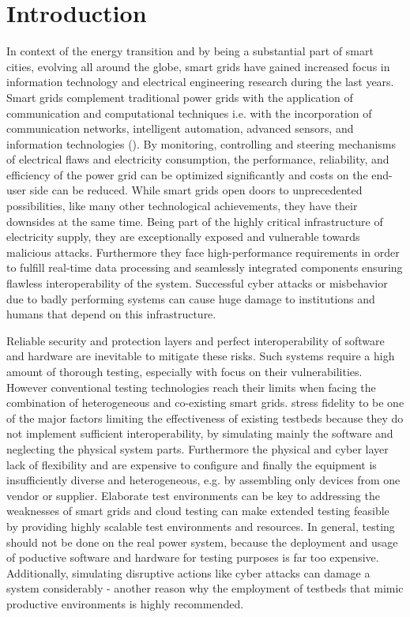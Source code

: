 \section{Introduction}
In context of the energy transition and by being a substantial part of smart cities, evolving all around the globe, smart grids have gained increased focus in information technology and electrical engineering research during the last years. Smart grids complement traditional power grids with the application of communication and computational techniques \cite{talaat2020hybrid} i.e. with the incorporation of communication networks, intelligent automation, advanced sensors, and information technologies (\cite{smadi2021comprehensive}). By monitoring, controlling and steering mechanisms of electrical flaws and electricity consumption, the performance, reliability, and efficiency of the power grid can be optimized significantly and costs on the end-user side can be reduced. While smart grids open doors to unprecedented possibilities, like many other technological achievements, they have their downsides at the same time. Being part of the highly critical infrastructure of electricity supply, they are exceptionally exposed and vulnerable towards malicious attacks. Furthermore they face high-performance requirements in order to fulfill real-time data processing and seamlessly integrated components ensuring flawless interoperability of the system. Successful cyber attacks or misbehavior due to badly performing systems can cause huge damage to institutions and humans that depend on this infrastructure.

Reliable security and protection layers and perfect interoperability of software and hardware are inevitable to mitigate these risks. Such systems require a high amount of thorough testing, especially with focus on their vulnerabilities. However conventional testing technologies reach their limits when facing the combination of heterogeneous and co-existing smart grids. \citeauthor{smadi2021comprehensive} stress fidelity to be one of the major factors limiting the effectiveness of existing testbeds because they do not implement sufficient interoperability, by simulating mainly the software and neglecting the physical system parts. Furthermore the physical and cyber layer lack of flexibility and are expensive to configure and finally the equipment is insufficiently diverse and heterogeneous, e.g. by assembling only devices from one vendor or supplier. Elaborate test environments can be key to addressing the weaknesses of smart grids and cloud testing can make extended testing feasible by providing highly scalable test environments and resources. In general, testing should not be done on the real power system, because the deployment and usage of poductive software and hardware for testing purposes is far too expensive. Additionally, simulating disruptive actions like cyber attacks can damage a system considerably - another reason why the employment of testbeds that mimic productive environments is highly recommended.

